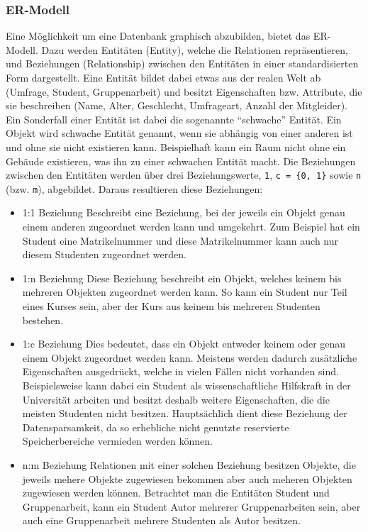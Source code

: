 \subsubsection{\acl{ER-Modell}}
Eine Möglichkeit um eine Datenbank graphisch abzubilden, bietet das \ac{ER-Modell}.
Dazu werden Entitäten (Entity), welche die Relationen repräsentieren, und Beziehungen (Relationship) zwischen den Entitäten in einer standardisierten Form dargestellt.
Eine Entität bildet dabei etwas aus der realen Welt ab (Umfrage, Student, Gruppenarbeit) und besitzt Eigenschaften bzw. Attribute, die sie beschreiben (Name, Alter, Geschlecht, Umfrageart, Anzahl der Mitgleider).
Ein Sonderfall einer Entität ist dabei die sogenannte \enquote{schwache} Entität.
Ein Objekt wird schwache Entität genannt, wenn sie abhängig von einer anderen ist und ohne sie nicht existieren kann.
Beispielhaft kann ein Raum nicht ohne ein Gebäude existieren, was ihn zu einer schwachen Entität macht. 
Die Beziehungen zwischen den Entitäten werden über drei Beziehungswerte, \texttt{1}, \texttt{c = \{0, 1\}} sowie \texttt{n} (bzw. \texttt{m}), abgebildet.
Daraus resultieren diese Beziehungen:

\begin{itemize}
    \item 1:1 Beziehung \newline
    Beschreibt eine Beziehung, bei der jeweils ein Objekt genau einem anderen zugeordnet werden kann und umgekehrt.
    Zum Beispiel hat ein Student eine Matrikelnummer und diese Matrikelnummer kann auch nur diesem Studenten zugeordnet werden.
    \item 1:n Beziehung \newline
    Diese Beziehung beschreibt ein Objekt, welches keinem bis mehreren Objekten zugeordnet werden kann.
    So kann ein Student nur Teil eines Kurses sein, aber der Kurs aus keinem bis mehreren Studenten bestehen.
    \item 1:c Beziehung \newline
    Dies bedeutet, dass ein Objekt entweder keinem oder genau einem Objekt zugeordnet werden kann.
    Meistens werden dadurch zusätzliche Eigenschaften ausgedrückt, welche in vielen Fällen nicht vorhanden sind.
	Beispielsweise kann dabei ein Student als wissenschaftliche Hilfskraft in der Universität arbeiten und besitzt deshalb weitere Eigenschaften, die die meisten Studenten nicht besitzen.
	Hauptsächlich dient diese Beziehung der Datensparsamkeit, da so erhebliche nicht genutzte reservierte Speicherbereiche vermieden werden können.
    \item n:m Beziehung \newline
    Relationen mit einer solchen Beziehung besitzen Objekte, die jeweils mehere Objekte zugewiesen bekommen aber auch meheren Objekten zugewiesen werden können.
    Betrachtet man die Entitäten Student und Gruppenarbeit, kann ein Student Autor mehrerer Gruppenarbeiten sein, aber auch eine Gruppenarbeit mehrere Studenten als Autor besitzen.
\end{itemize}


